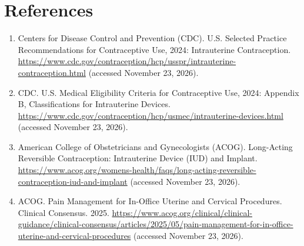 \section*{References}
\begin{enumerate}
  \item Centers for Disease Control and Prevention (CDC). U.S. Selected Practice Recommendations for Contraceptive Use, 2024: Intrauterine Contraception. \url{https://www.cdc.gov/contraception/hcp/usspr/intrauterine-contraception.html} (accessed November 23, 2026).
  \item CDC. U.S. Medical Eligibility Criteria for Contraceptive Use, 2024: Appendix B, Classifications for Intrauterine Devices. \url{https://www.cdc.gov/contraception/hcp/usmec/intrauterine-devices.html} (accessed November 23, 2026).
  \item American College of Obstetricians and Gynecologists (ACOG). Long-Acting Reversible Contraception: Intrauterine Device (IUD) and Implant. \url{https://www.acog.org/womens-health/faqs/long-acting-reversible-contraception-iud-and-implant} (accessed November 23, 2026).
  \item ACOG. Pain Management for In-Office Uterine and Cervical Procedures. Clinical Consensus. 2025. \url{https://www.acog.org/clinical/clinical-guidance/clinical-consensus/articles/2025/05/pain-management-for-in-office-uterine-and-cervical-procedures} (accessed November 23, 2026).
\end{enumerate}

\clearpage
